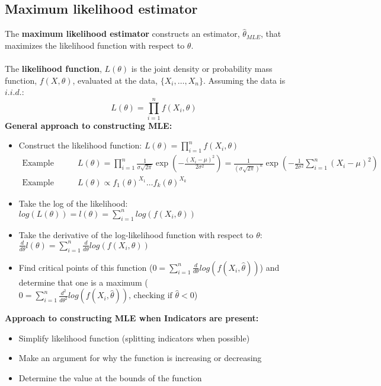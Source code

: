 \documentclass{article}
\begin{document}
\subsection{Maximum likelihood estimator}
The \textbf{maximum likelihood estimator} constructs an estimator, $\hat{\theta}_{MLE}$, that maximizes the likelihood function with respect to $\theta$. \\ \\
The \textbf{likelihood function}, $L(\theta)$ is the joint density or probability mass function, $f(X, \theta)$, evaluated at the data, $\{X_i, \dots, X_n\}$. Assuming the data is $i.i.d.$:
\begin{equation*}
    L(\theta) = \prod_{i=1}^nf(X_i, \theta)
\end{equation*}
\textbf{General approach to constructing MLE:}
\begin{itemize}
    \item Construct the likelihood function: $L(\theta) = \prod_{i=1}^nf(X_i, \theta)$
    \begin{align*}
        \textrm{Example normal: } &L(\theta) = \prod_{i=1}^n \frac{1}{\sigma \sqrt{2 \pi}} \exp \left (-\frac{(X_i - \mu)^2}{2 \sigma ^ 2}\right ) = \frac{1}{(\sigma \sqrt{2 \pi})^n} \exp \left( -\frac{1}{2 \sigma ^ 2} \sum_{i=1}^n (X_i - \mu)^2 \right)\\
        \textrm{Example restricted multinomial: } &L(\theta) \propto f_1(\theta)^{X_1}\dots f_k(\theta)^{X_k}
    \end{align*}
    \item Take the log of the likelihood: $log(L(\theta)) = l(\theta) = \sum_{i=1}^nlog(f(X_i, \theta))$
    \item Take the derivative of the log-likelihood function with respect to $\theta$: $\frac{d}{d\theta}l(\theta) = \sum_{i=1}^n\frac{d}{d\theta}log(f(X_i, \theta))$
    \item Find critical points of this function ($0 = \sum_{i=1}^n\frac{d}{d\theta}log(f(X_i, \hat{\theta}))$) and determine that one is a maximum ($0 = \sum_{i=1}^n\frac{d^2}{d\theta^2}log(f(X_i, \hat{\theta})) \textrm{, checking if } \hat{\theta} < 0$)
\end{itemize}
\textbf{Approach to constructing MLE when Indicators are present:}
\begin{itemize}
    \item Simplify likelihood function (splitting indicators when possible)
    \item Make an argument for why the function is increasing or decreasing
    \item Determine the value at the bounds of the function
\end{itemize}
\end{document}

